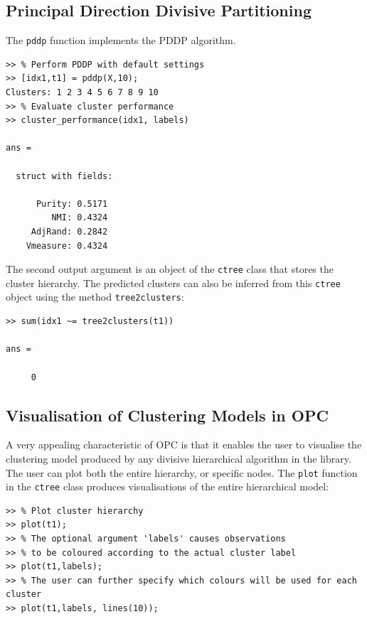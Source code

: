 \documentclass{book}
\begin{document}
\subsection{Principal Direction Divisive Partitioning}

The {\tt pddp} function implements the PDDP algorithm.

\begin{verbatim}
>> % Perform PDDP with default settings
>> [idx1,t1] = pddp(X,10);
Clusters: 1 2 3 4 5 6 7 8 9 10
>> % Evaluate cluster performance
>> cluster_performance(idx1, labels)

ans = 

  struct with fields:

      Purity: 0.5171
         NMI: 0.4324
     AdjRand: 0.2842
    Vmeasure: 0.4324

\end{verbatim}

\noindent
%
The second output argument is an object of the {\tt ctree} class that stores the
cluster hierarchy.
%
The predicted clusters can also be inferred from this {\tt ctree} object using the
method {\tt tree2clusters}:

\begin{verbatim}
>> sum(idx1 ~= tree2clusters(t1))

ans = 

     0

\end{verbatim}


\subsection{Visualisation of Clustering Models in OPC}

\noindent
%
A very appealing characteristic of OPC is that it enables the user to visualise
the clustering model produced by any divisive hierarchical algorithm in the
library. The user can plot both the entire hierarchy, or specific nodes. The
{\tt plot} function in the {\tt ctree} class produces visualisations of the
entire hierarchical model:

\begin{verbatim}
>> % Plot cluster hierarchy
>> plot(t1); 
>> % The optional argument 'labels' causes observations
>> % to be coloured according to the actual cluster label
>> plot(t1,labels); 
>> % The user can further specify which colours will be used for each cluster
>> plot(t1,labels, lines(10)); 
\end{verbatim}
\end{document}
